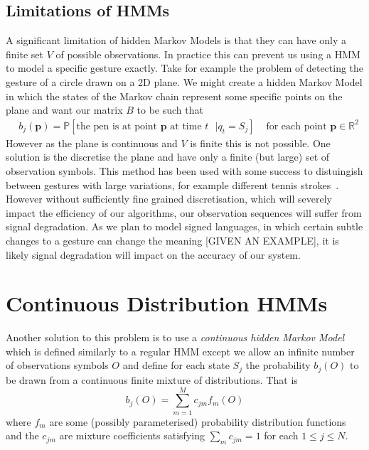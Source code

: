 \subsection{Limitations of HMMs}
A significant limitation of hidden Markov Models is that they can have only a finite set $V$ of possible observations. In practice this can prevent us using a HMM to model a specific gesture exactly. Take for example the problem of detecting the gesture of a circle drawn on a 2D plane. We might create a hidden Markov Model in which the states of the Markov chain represent some specific points on the plane and want our matrix $B$ to be such that
\begin{align*}
&b_j(\bm{p}) = \mathbb{P}[\text{the pen is at point $\bm{p}$ at time $t$ } | q_t = S_j] &\text{ for each point $\bm{p}\in\mathbb{R}^2$}
\end{align*}
However as the plane is continuous and $V$ is finite this is not possible. One solution is the discretise the plane and have only a finite (but large) set of observation symbols. This method has been used with some success to distuingish between gestures with large variations, for example different tennis strokes~\citep{yamato1992recognizing}. However without sufficiently fine grained discretisation, which will severely impact the efficiency of our algorithms, our observation sequences will suffer from signal degradation. As we plan to model signed languages, in which certain subtle changes to a gesture can change the meaning {\color{green}[GIVEN AN EXAMPLE]}, it is likely signal degradation will impact on the accuracy of our system.

\section{Continuous Distribution HMMs}
Another solution to this problem is to use a \emph{continuous hidden Markov Model}~\citep{rabiner1989tutorial, dym2011hmm} which is defined similarly to a regular HMM except we allow an infinite number of observations symbols $O$ and define for each state $S_j$ the probability $b_j(O)$ to be drawn from a continuous finite mixture of distributions. That is
\begin{equation*}
b_j(O) = \sum_{m=1}^M c_{jm}f_m(O)
\end{equation*}
where $f_m$ are some (possibly parameterised) probability distribution functions and the $c_{jm}$ are mixture coefficients satisfying $\sum_m c_{jm} = 1$ for each $1 \leq j \leq N$. 

